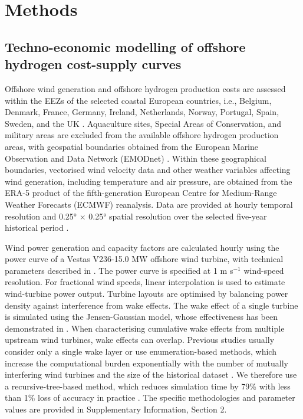 \documentclass[pdflatex,sn-mathphys,Numbered]{sn-jnl}%
\begin{document}
\section{Methods}\label{sec11}

\subsection{Techno-economic modelling of offshore hydrogen cost-supply curves}

Offshore wind generation and offshore hydrogen production costs are assessed within the EEZs of the selected coastal European countries, i.e., Belgium, Denmark, France, Germany, Ireland, Netherlands, Norway, Portugal, Spain, Sweden, and the UK \cite{Marineregions}. Aquaculture sites, Special Areas of Conservation, and military areas are excluded from the available offshore hydrogen production areas, with geospatial boundaries obtained from the European Marine Observation and Data Network (EMODnet) \cite{EMODnet}.
Within these geographical boundaries, vectorised wind velocity data and other weather variables affecting wind generation, including temperature and air pressure, are obtained from the ERA-5 product of the fifth-generation European Centre for Medium-Range Weather Forecasts (ECMWF) reanalysis. Data are provided at hourly temporal resolution and 0.25° $\times$ 0.25° spatial resolution over the selected five-year historical period \cite{ERA5}.

Wind power generation and capacity factors are calculated hourly using the power curve of a Vestas V236-15.0 MW offshore wind turbine, with technical parameters described in \cite{V23615}. The power curve is specified at 1 m s$^{-1}$ wind-speed resolution. For fractional wind speeds, linear interpolation is used to estimate wind-turbine power output.
Turbine layouts are optimised by balancing power density against interference from wake effects. The wake effect of a single turbine is simulated using the Jensen-Gaussian model, whose effectiveness has been demonstrated in \cite{tao2019optimal}.
When characterising cumulative wake effects from multiple upstream wind turbines, wake effects can overlap. Previous studies usually consider only a single wake layer or use enumeration-based methods, which increase the computational burden exponentially with the number of mutually interfering wind turbines and the size of the historical dataset \cite{paul2019multi, tao2020joint}. We therefore use a recursive-tree-based method, which reduces simulation time by 79\% with less than 1\% loss of accuracy in practice \cite{Figshare}.
The specific methodologies and parameter values are provided in Supplementary Information, Section 2.
\end{document}

